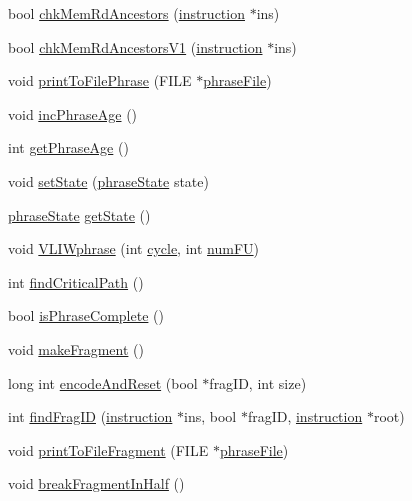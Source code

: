 \begin{DoxyCompactItemize}
\item 
bool \hyperlink{classphrase_ae371c7fde2523a4624f99eb26d285d46}{chkMemRdAncestors} (\hyperlink{classinstruction}{instruction} $\ast$ins)
\item 
bool \hyperlink{classphrase_ae326fd2bc9f95549a7b50e651d45ef94}{chkMemRdAncestorsV1} (\hyperlink{classinstruction}{instruction} $\ast$ins)
\item 
void \hyperlink{classphrase_af45d48855c3166b6946c6e0bf670baf7}{printToFilePhrase} (FILE $\ast$\hyperlink{bkEnd_8cpp_a77fc2d35c5f7077be762435e06e16bd2}{phraseFile})
\item 
void \hyperlink{classphrase_a018c05c468cda3c143161ca33c8ff509}{incPhraseAge} ()
\item 
int \hyperlink{classphrase_ac1d55c581972c220a09344e973da7bf3}{getPhraseAge} ()
\item 
void \hyperlink{classphrase_a4df8152811c37d4e9bb0411bac21c403}{setState} (\hyperlink{backend_2phrase_8h_a3294774a0e37027c6448a427863a2acb}{phraseState} state)
\item 
\hyperlink{backend_2phrase_8h_a3294774a0e37027c6448a427863a2acb}{phraseState} \hyperlink{classphrase_a5f8a83c49715eab2fc1691ecc26fc50b}{getState} ()
\item 
void \hyperlink{classphrase_ad83361bffa7f64be8b2d6b0afbe8623c}{VLIWphrase} (int \hyperlink{vliwScheduler_8cpp_a1f4871d45089b039d95d3832dd123827}{cycle}, int \hyperlink{phraseGen_8cpp_ae0b3cf4db09e8c26c2ab03dbe18bfb19}{numFU})
\item 
int \hyperlink{classphrase_a68898ebaf9e7e7b7580a920d6be2c066}{findCriticalPath} ()
\item 
bool \hyperlink{classphrase_abaa9a85aff76b4528ca69371729111be}{isPhraseComplete} ()
\item 
void \hyperlink{classphrase_ad596b3bf1c197e53a509dc02f41957cd}{makeFragment} ()
\item 
long int \hyperlink{classphrase_aee82b58cfbfec1853f6ffe760b3d50e3}{encodeAndReset} (bool $\ast$fragID, int size)
\item 
int \hyperlink{classphrase_a9a8d1a98b5fce63230b715ca6ac281ef}{findFragID} (\hyperlink{classinstruction}{instruction} $\ast$ins, bool $\ast$fragID, \hyperlink{classinstruction}{instruction} $\ast$root)
\item 
void \hyperlink{classphrase_a555253effe54e3dc88d47d5e33a7baa1}{printToFileFragment} (FILE $\ast$\hyperlink{bkEnd_8cpp_a77fc2d35c5f7077be762435e06e16bd2}{phraseFile})
\item 
void \hyperlink{classphrase_ad84f9f31532ab90299e6e32b8daee0ff}{breakFragmentInHalf} ()

\end{DoxyCompactItemize}
